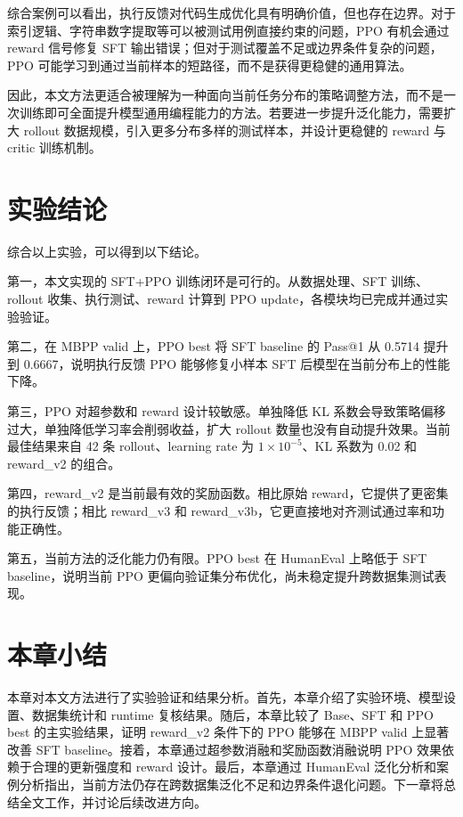 综合案例可以看出，执行反馈对代码生成优化具有明确价值，但也存在边界。对于索引逻辑、字符串数字提取等可以被测试用例直接约束的问题，PPO 有机会通过 reward 信号修复 SFT 输出错误；但对于测试覆盖不足或边界条件复杂的问题，PPO 可能学习到通过当前样本的短路径，而不是获得更稳健的通用算法。

因此，本文方法更适合被理解为一种面向当前任务分布的策略调整方法，而不是一次训练即可全面提升模型通用编程能力的方法。若要进一步提升泛化能力，需要扩大 rollout 数据规模，引入更多分布多样的测试样本，并设计更稳健的 reward 与 critic 训练机制。

\section{实验结论}

综合以上实验，可以得到以下结论。

第一，本文实现的 SFT+PPO 训练闭环是可行的。从数据处理、SFT 训练、rollout 收集、执行测试、reward 计算到 PPO update，各模块均已完成并通过实验验证。

第二，在 MBPP valid 上，PPO best 将 SFT baseline 的 Pass@1 从 0.5714 提升到 0.6667，说明执行反馈 PPO 能够修复小样本 SFT 后模型在当前分布上的性能下降。

第三，PPO 对超参数和 reward 设计较敏感。单独降低 KL 系数会导致策略偏移过大，单独降低学习率会削弱收益，扩大 rollout 数量也没有自动提升效果。当前最佳结果来自 42 条 rollout、learning rate 为 $1\times10^{-5}$、KL 系数为 0.02 和 reward\_v2 的组合。

第四，reward\_v2 是当前最有效的奖励函数。相比原始 reward，它提供了更密集的执行反馈；相比 reward\_v3 和 reward\_v3b，它更直接地对齐测试通过率和功能正确性。

第五，当前方法的泛化能力仍有限。PPO best 在 HumanEval 上略低于 SFT baseline，说明当前 PPO 更偏向验证集分布优化，尚未稳定提升跨数据集测试表现。

\section{本章小结}

本章对本文方法进行了实验验证和结果分析。首先，本章介绍了实验环境、模型设置、数据集统计和 runtime 复核结果。随后，本章比较了 Base、SFT 和 PPO best 的主实验结果，证明 reward\_v2 条件下的 PPO 能够在 MBPP valid 上显著改善 SFT baseline。接着，本章通过超参数消融和奖励函数消融说明 PPO 效果依赖于合理的更新强度和 reward 设计。最后，本章通过 HumanEval 泛化分析和案例分析指出，当前方法仍存在跨数据集泛化不足和边界条件退化问题。下一章将总结全文工作，并讨论后续改进方向。
